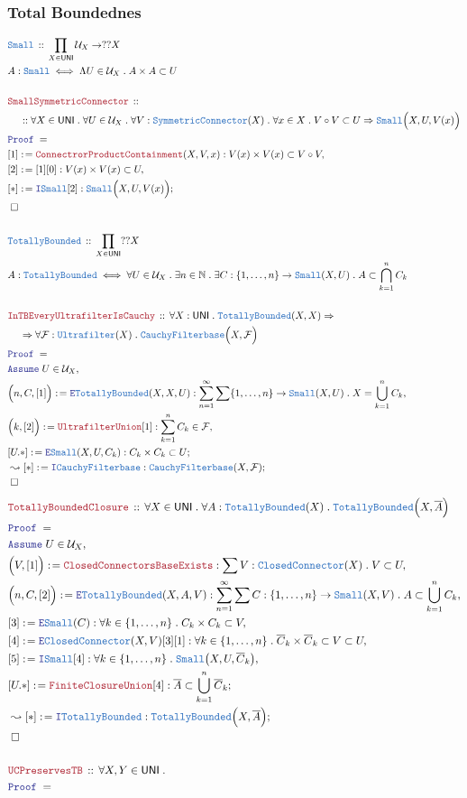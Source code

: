 \documentclass[12pt]{scrartcl}
\newcommand{\TYPE}[1]{\textcolor{NavyBlue}{\mathtt{#1}}}
\newcommand{\LOGIC}[1]{\textcolor{Blue}{\mathtt{#1}}}
\newcommand{\THM}[1]{\textcolor{Maroon}{\mathtt{#1}}}
\renewcommand{\.}{\; . \;}
\newcommand{\de}{: \kern 0.1pc =}
\newcommand{\Theorem}[2]{& \THM{#1} \, :: \, #2 \\ & \Proof = \\ }
\newcommand{\DeclareType}[2]{& \TYPE{#1} \, :: \, #2 \\}
\newcommand{\DefineType}[3]{& #1 : \TYPE{#2} \iff #3 \\}
\newcommand{\NewLine}{\\ & \kern 1pc}
\newcommand{\Page}[1]{ \begin{align*} #1 \end{align*}   }
\newcommand{\Imply}{\Rightarrow}
\newcommand{\Nat}{\mathbb{N} }
\newcommand{\Ultrafilter}{\TYPE{Ultrafilter}}
\newcommand{\Say}[3]{& #1 \de #2 : #3, \\}
\newcommand{\Conclude}[3]{& #1 \de #2 : #3; \\}
\newcommand{\DeriveConclude}[3]{& \leadsto #1 \de #2 : #3 ; \\}
\newcommand{\AssumeIn}[2]{& \LOGIC{Assume} \; #1 \in #2, \\}
\newcommand{\Intro}{\LOGIC{I}}
\newcommand{\Elim}{\LOGIC{E}}
\newcommand{\QED}{\; \square}
\newcommand{\EndProof}{& \QED \\}
\newcommand{\Proof}{\LOGIC{Proof} \; }
\renewcommand{\U}{\mathcal{U}}
\newcommand{\F}{\mathcal{F}}
\newcommand{\UNI}{\mathsf{UNI}}
\newcommand{\CConnector}{\TYPE{ClosedConnector}}
\newcommand{\Sym}{\TYPE{SymmetricConnector}}
\newcommand{\CF}{\TYPE{CauchyFilterbase}}
\newcommand{\Small}{\TYPE{Small}}
\newcommand{\TB}{\TYPE{TotallyBounded}}
\begin{document}
\subsubsection{Total Boundednes}
\Page{
	\DeclareType{Small}{\prod_{X \in \UNI} \U_X \to ??X}
	\DefineType{A}{Small}{\Lambda U \in \U_X \.  A \times A  \subset U }
	\\
	\Theorem{SmallSymmetricConnector}
	{
		\NewLine ::
		\forall X \in \UNI \. 
		\forall U \in \U_X \.
		\forall V : \Sym(X) \.
		\forall x \in X \.
		V \circ V \subset U \Imply \Small\Big(X,U,V(x)\Big)
	}
	\Say{[1]}{\THM{ConnectrorProductContainment}(X,V,x)}
	{
		V(x) \times V(x) \subset V \circ V
	}
	\Say{[2]}{[1][0]}{V(x) \times V(x) \subset U}
	\Conclude{[*]}{\Intro \Small [2]}{\Small\Big(X,U,V(x)\Big)}
	\EndProof
	\\
	\DeclareType{\TB}{\prod_{X \in \UNI} ??X}
	\DefineType{A}{\TB}{
		\forall U \in \U_X \. 
		\exists n \in \Nat \.
		\exists C : \{1, \ldots, n \} \to \Small(X,U) \.
		A \subset \bigcap^n_{k=1} C_k
	}
	\\
	\Theorem{InTBEveryUltrafilterIsCauchy}
	{
		\forall X : \UNI \.   
		\TB(X,X)
		\Imply \NewLine \Imply
		\forall \F : \Ultrafilter(X) \.
		\CF\Big( X, \F \Big)
	}
	\AssumeIn{U}{\U_X}
	\Say{\Big(n,C,[1]\Big)}{\Elim \TB(X,X,U)}
	{
		\sum^\infty_{n=1} \sum \{1,\ldots,n\} \to \Small(X,U) \. 
		X = \bigcup^n_{k=1} C_k
	}
	\Say{\Big(k,[2]\Big)}{\THM{UltrafilterUnion}[1]}
	{
		\sum^n_{k=1} C_k \in \F 
	}
	\Conclude{[U.*]}{\Elim \Small(X,U,C_k)}{C_k \times C_k \subset U}
	\DeriveConclude{[*]}{\Intro \CF}{\CF(X,\F)}
	\EndProof
}\Page{
	\Theorem{TotallyBoundedClosure}
	{
		\forall X \in \UNI \.
		\forall A : \TB(X) \.
		\TB\Big(X, \overline{A} \Big)
	}
	\AssumeIn{U}{\U_X}
	\Say{\Big(V,[1]\Big)}{\THM{ClosedConnectorsBaseExists}}
	{
		\sum V : \CConnector(X) \. V \subset U
	}
	\Say{\Big(n,C,[2]\Big)}{\Elim \TB(X, A, V )}
	{
		\sum^\infty_{n=1}
		\sum C : \{1,\ldots,n\} \to \Small(X,V) \.
		A \subset \bigcup^n_{k=1} C_k
	}
	\Say{[3]}{\Elim \Small(C)}
	{
		\forall k \in \{1,\ldots,n\} \. C_k \times C_k \subset V
	}
	\Say{[4]}{\Elim \CConnector(X,V)[3][1]}
	{
		\forall k \in \{1,\ldots,n\} \. 
		\overline{C}_k \times \overline{C}_k \subset V \subset U
	}
	\Say{[5]}{\Intro \Small [4]}
	{
		\forall k \in \{1,\ldots,n\} \. 
		\Small\big(X,U,\overline{C}_k\big)
	}
	\Conclude{[U.*]}{\THM{FiniteClosureUnion}[4]}
	{
		\overline{A} \subset \bigcup^n_{k=1} \overline{C}_k
	}
	\DeriveConclude{[*]}{\Intro \TB}{\TB\Big(X,\overline{A} \Big)}
	\EndProof
	\\
	\Theorem{UCPreservesTB}
	{
		\forall X,Y \in \UNI \.
}}
\end{document}
